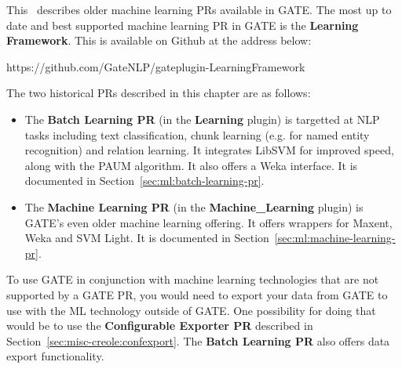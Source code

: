 


This \chapthing\ describes older machine learning PRs available in
GATE. The most up to date and best supported machine learning PR in
GATE is the \textbf{Learning Framework}. This is available on Github
at the address below:

https://github.com/GateNLP/gateplugin-LearningFramework

The two historical PRs described in this chapter are as follows:

\begin{itemize}

\item{The \textbf{Batch Learning PR} (in the \textbf{Learning} plugin) is targetted at NLP tasks including text classification, chunk learning (e.g. for
named entity recognition) and relation learning. It integrates LibSVM
for improved speed, along with the PAUM algorithm. It also offers a
Weka interface. It is documented in
Section~\ref{sec:ml:batch-learning-pr}.}

\item{The \textbf{Machine Learning PR} (in the \textbf{Machine\_Learning} plugin)
is GATE's even older machine learning offering. It offers wrappers for
Maxent, Weka and SVM Light. It is documented in
Section~\ref{sec:ml:machine-learning-pr}.}

\end{itemize}

To use GATE in conjunction with machine learning technologies that are
not supported by a GATE PR, you would need to export your data from
GATE to use with the ML technology outside of GATE. One possibility
for doing that would be to use the \textbf{Configurable Exporter PR}
described in
Section~\ref{sec:misc-creole:confexport}. The \textbf{Batch Learning
PR} also offers data export functionality.

